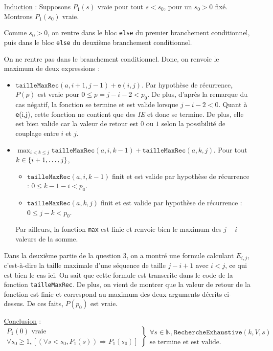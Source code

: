 \documentclass[12pt,a4paper]{article}
\begin{document}
\medskip
\underline{Induction} : Supposons \( P_{1}(s) \) vraie pour tout \( s < s_0 \), pour un $s_0>0$ fix\'e. Montrons \( P_{1}(s_0) \) vraie.

Comme $s_0 > 0$, on rentre dans le bloc \texttt{else} du premier branchement conditionnel, puis dans le bloc \texttt{else} du deuxi\`eme branchement conditionnel. 

On ne rentre pas dans le branchement conditionnel. Donc, on renvoie le maximum de deux expressions :
	
	\begin{itemize}
		\item $\texttt{tailleMaxRec}(a,i+1,j-1) + \texttt{e}(i,j)$. Par hypoth\`ese de r\'ecurrence, $P(p)$ est vraie pour $0 \leq p=j-i-2 < p_0$. De plus, d'apr\`es la remarque du cas n\'egatif, la fonction se termine et est valide lorsque $j-i-2<0$. Quant \`a \texttt{e}(i,j), cette fonction ne contient que des {\itshape IE} et donc se termine. De plus, elle est bien valide car la valeur de retour est $0$ ou $1$ selon la possibilit\'e de couplage entre $i$ et $j$.
		\item $\displaystyle\max_{i < k \leq j} {\texttt{tailleMaxRec}(a,i,k-1)+\texttt{tailleMaxRec}(a,k,j)}$. Pour tout $\\k \in \{i+1, \dotsc, j\}$, 
		\begin{itemize}
			\item $\texttt{tailleMaxRec}(a,i,k-1)$ finit et est valide par hypoth\`ese de r\'ecurrence : $0 \leq k-1-i < p_0$. 
			\item $\texttt{tailleMaxRec}(a,k,j)$ finit et est valide par hypoth\`ese de r\'ecurrence : $0 \leq j-k < p_0$.
		\end{itemize}
		Par ailleurs, la fonction \texttt{max} est finie et renvoie bien le maximum des $j-i$ valeurs de la somme.
	\end{itemize}
	
	Dans la deuxi\`eme partie de la question 3, on a montr\'e une formule calculant $E_{i,j}$, c'est-\`a-dire la taille maximale d'une s\'equence de taille $j-i+1$ avec $i<j$, ce qui est bien le cas ici. On sait que cette formule est transcrite dans le code de la fonction \texttt{tailleMaxRec}. De plus, on vient de montrer que la valeur de retour de la fonction est finie et correspond au maximum des deux arguments d\'ecrits ci-dessus. De ces faits, $P(p_0)$ est vraie.
	
\medskip
\underline{Conclusion} : 
\begin{equation*}
\left .\begin{array}{l}
P_{1}(0) \text{ vraie } \\
\forall s_0 \geq 1, [(\forall s < s_0, P_{1}(s)) \Rightarrow P_{1}(s_0) ]
\end{array} \right \}
\left .\begin{array}{l}
\forall s \in \mathbb{N}, \texttt{RechercheExhaustive}(k,V,s) \\
\text{se termine et est valide.}
\end{array}\right .
\end{equation*}
\end{document}
